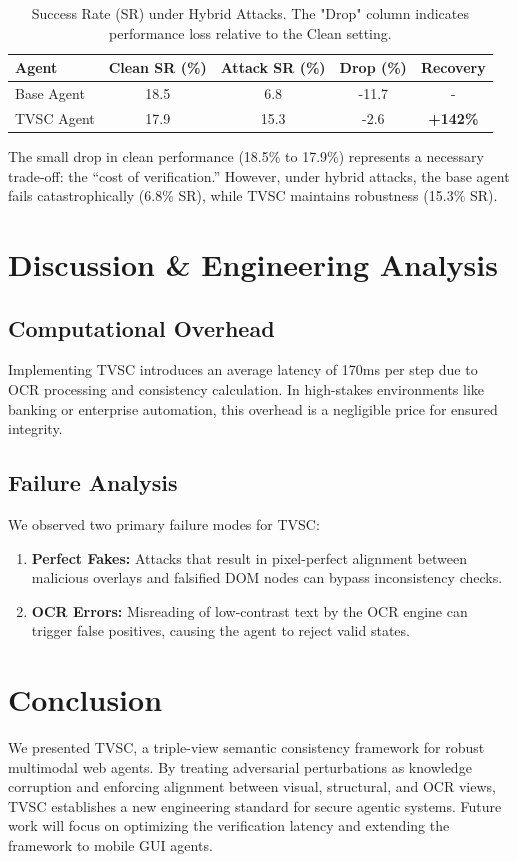 \documentclass[runningheads]{llncs}
\begin{document}
\begin{table}
\caption{Success Rate (SR) under Hybrid Attacks. The "Drop" column indicates performance loss relative to the Clean setting.}
\label{tab:results}
\centering
\begin{tabular}{lcccc}
\toprule
\textbf{Agent} & \textbf{Clean SR (\%)} & \textbf{Attack SR (\%)} & \textbf{Drop (\%)} & \textbf{Recovery} \\
\midrule
Base Agent & 18.5 & 6.8 & -11.7 & - \\
TVSC Agent & 17.9 & 15.3 & -2.6 & \textbf{+142\%} \\
\bottomrule
\end{tabular}
\end{table}

The small drop in clean performance (18.5\% to 17.9\%) represents a necessary trade-off: the ``cost of verification.'' However, under hybrid attacks, the base agent fails catastrophically (6.8\% SR), while TVSC maintains robustness (15.3\% SR).

\section{Discussion \& Engineering Analysis}
\subsection{Computational Overhead}
Implementing TVSC introduces an average latency of 170ms per step due to OCR processing and consistency calculation. In high-stakes environments like banking or enterprise automation, this overhead is a negligible price for ensured integrity.

\subsection{Failure Analysis}
We observed two primary failure modes for TVSC:
\begin{enumerate}
    \item \textbf{Perfect Fakes:} Attacks that result in pixel-perfect alignment between malicious overlays and falsified DOM nodes can bypass inconsistency checks.
    \item \textbf{OCR Errors:} Misreading of low-contrast text by the OCR engine can trigger false positives, causing the agent to reject valid states.
\end{enumerate}

\section{Conclusion}
We presented TVSC, a triple-view semantic consistency framework for robust multimodal web agents. By treating adversarial perturbations as knowledge corruption and enforcing alignment between visual, structural, and OCR views, TVSC establishes a new engineering standard for secure agentic systems. Future work will focus on optimizing the verification latency and extending the framework to mobile GUI agents.
\end{document}
